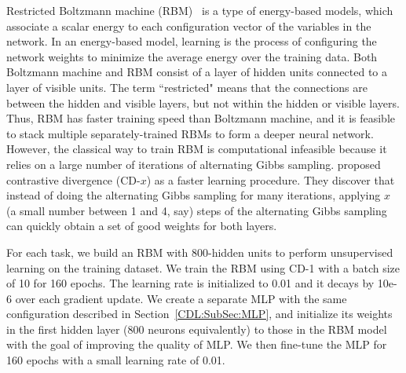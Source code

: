 Restricted Boltzmann machine (RBM)~\cite{DeepBeliefNets} is a type of energy-based models, which associate a scalar energy to each configuration vector of the variables in the network.
In an energy-based model, learning is the process of configuring the network weights to minimize the average energy over the training data.
Both Boltzmann machine and RBM consist of a layer of hidden units connected to a layer of visible units.
The term ``restricted" means that the connections are between the hidden and visible layers, but not within the hidden or visible layers.
Thus, RBM has faster training speed than Boltzmann machine, and it is feasible to stack multiple separately-trained RBMs to form a deeper neural network.
However, the classical way to train RBM is computational infeasible because it relies on a large number of iterations of alternating Gibbs sampling.
\cite{DeepBeliefNets} proposed contrastive divergence (CD-$x$) as a faster learning procedure.
They discover that instead of doing the alternating Gibbs sampling for many iterations,
applying $x$ (a small number between 1 and 4, say) steps of the alternating Gibbs sampling can quickly obtain a set of good weights for both layers.

For each task, we build an RBM with 800-hidden units to perform unsupervised learning on the training dataset.
We train the RBM using CD-1 with a batch size of 10 for 160 epochs.
The learning rate is initialized to 0.01 and it decays by 10e-6 over each gradient update.
We create a separate MLP with the same configuration described in Section~\ref{CDL:SubSec:MLP}, and initialize its weights in the first hidden layer (800 neurons equivalently) to those in the RBM model with the goal of improving the quality of MLP.
We then fine-tune the MLP for 160 epochs with a small learning rate of 0.01.


